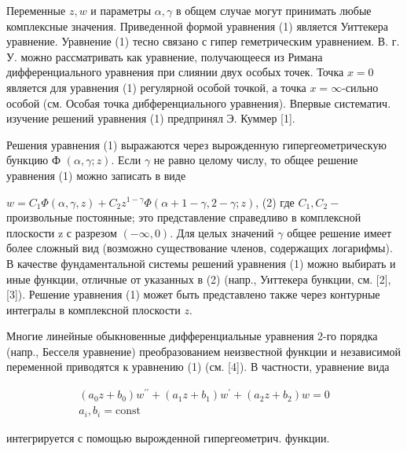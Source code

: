\documentclass[10pt]{article}
\begin{document}
Переменные $z, w$ и параметры $\alpha, \gamma$ в общем случае могут принимать любые комплексные значения. Приведенной формой уравнения (1) является Уиттекера уравнение. Уравнение (1) тесно связано с гипер геметрическим уравнением. В. г. У. можно рассматривать как уравнение, получающееся из Римана дифференциального уравнения при слиянии двух особых точек. Точка $x=0$ является для уравнения (1) регулярной особой точкой, а точка $x=\infty$-сильно особой (см. Особая точка дибференциального уравнения). Впервые систематич. изучение решений уравнения (1) предпринял Э. Куммер [1].



Решения уравнения (1) выражаются через вырожденную гипергеометрическую бункцию Ф $(\alpha, \gamma ; z)$. Если $\gamma$ не равно целому числу, то общее решение уравнения (1) можно записать в виде



$w=C_{1} \Phi(\alpha, \gamma, z)+C_{2} z^{1-\gamma} \Phi(\alpha+1-\gamma, 2-\gamma ; z)$, (2) где $C_{1}, C_{2}-$ произвольные постоянные; это представление справедливо в комплексной плоскости z с разрезом $(-\infty, 0)$. Для целых значений $\gamma$ общее решение имеет более сложный вид (возможно существование членов, содержащих логарифмы). В качестве фундаментальной системы решений уравнения (1) можно выбирать и иные функции, отличные от указанных в (2) (напр., Уиттекера бункции, см. [2], [3]). Решение уравнения (1) может быть представлено также через контурные интегралы в комплексной плоскости $z$.



Многие линейные обыкновенные дифференциальные уравнения 2-го порядка (напр., Бесселя уравнение) преобразованием неизвестной функции и независимой переменной приводятся к уравнению (1) (см. [4]). В частности, уравнение вида



\[

\begin{gathered}

\left(a_{0} z+b_{0}\right) w^{\prime \prime}+\left(a_{1} z+b_{1}\right) w^{\prime}+\left(a_{2} z+b_{2}\right) w=0 \\

a_{i}, b_{i}=\mathrm{const}

\end{gathered}

\]



интегрируется с помощью вырожденной гипергеометрич. функции.
\end{document}
